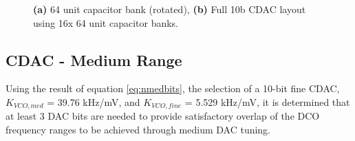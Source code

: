 \begin{figure}[htb!]
\begin{subfigure}{0.5\textwidth}
	        \caption{ }
	        \label{fig:lay_cdac_unit}
	    \end{subfigure}
	    \caption{\textbf{(a)} 64 unit capacitor bank (rotated), \textbf{(b)} Full 10b CDAC layout using 16x 64 unit capacitor banks.}
	    \label{fig:10bcdac_lay}
	\end{figure} 


	\FloatBarrier
	\subsection{CDAC - Medium Range}
	Using the result of equation \ref{eq:nmedbits}, the selection of a 10-bit fine CDAC, $K_{VCO,med}$ = 39.76 kHz/mV, and $K_{VCO,fine}$ = 5.529 kHz/mV, it is determined that at least 3 DAC bits are needed to provide satisfactory overlap of the DCO frequency ranges to be achieved through medium DAC tuning.
